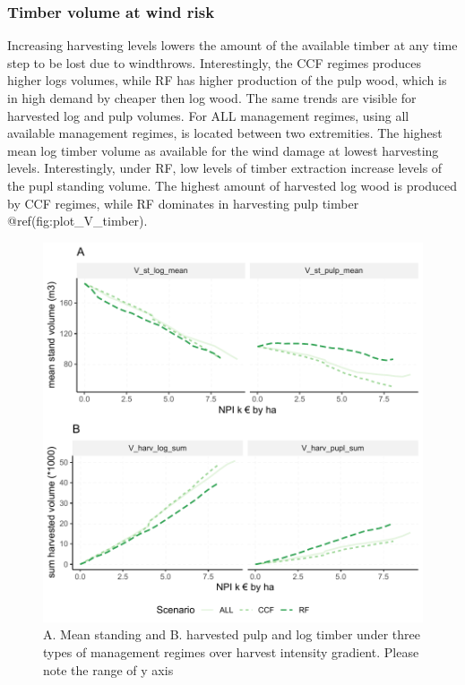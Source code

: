 \documentclass[]{elsarticle} %
\makeatletter
\def\maxwidth{\ifdim\Gin@nat@width>\linewidth\linewidth
\else\Gin@nat@width\fi}
\let\Oldincludegraphics\includegraphics
\renewcommand{\includegraphics}[1]{\Oldincludegraphics[width=\maxwidth]{#1}}
\makeatother
\begin{document}
\subsubsection{Timber volume at wind
risk}\label{timber-volume-at-wind-risk}

Increasing harvesting levels lowers the amount of the available timber
at any time step to be lost due to windthrows. Interestingly, the CCF
regimes produces higher logs volumes, while RF has higher production of
the pulp wood, which is in high demand by cheaper then log wood. The
same trends are visible for harvested log and pulp volumes. For ALL
management regimes, using all available management regimes, is located
between two extremities. The highest mean log timber volume as available
for the wind damage at lowest harvesting levels. Interestingly, under
RF, low levels of timber extraction increase levels of the pupl standing
volume. The highest amount of harvested log wood is produced by CCF
regimes, while RF dominates in harvesting pulp timber
@ref(fig:plot\_V\_timber).

\begin{figure}
\centering
\includegraphics{test_manus_files/figure-latex/plot_V_timber-1.pdf}
\caption{A. Mean standing and B. harvested pulp and log timber under
three types of management regimes over harvest intensity gradient.
Please note the range of y axis}
\end{figure}
\end{document}
